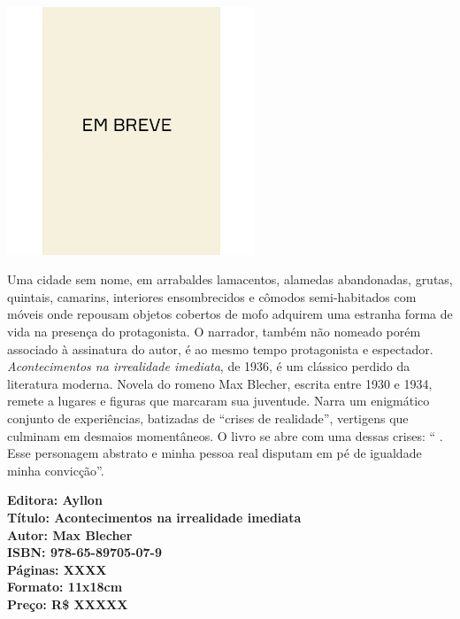 \pagebreak


\begin{center}
\hspace*{.5cm}\includegraphics[width=74mm]{./grid/breve.jpeg}
\end{center}

\hspace*{-7cm}\hrulefill\hspace*{-7cm}

\medskip

\noindent{}Uma cidade sem nome, em arrabaldes lamacentos, alamedas abandonadas, grutas, quintais, camarins, interiores ensombrecidos e cômodos semi-habitados com móveis onde repousam objetos cobertos de mofo adquirem uma estranha forma de vida na presença do protagonista. O narrador, também não nomeado porém associado à assinatura do autor, é ao mesmo tempo protagonista e espectador. 
\textit{Acontecimentos na irrealidade imediata}, de 1936, é um clássico perdido da literatura moderna. Novela do romeno Max Blecher, escrita entre 1930 e 1934, remete a lugares e figuras que marcaram sua juventude. Narra um enigmático conjunto de experiências, batizadas de ``crises de realidade'', vertigens que culminam em desmaios momentâneos. O livro se abre com uma dessas crises: `` . Esse personagem abstrato e minha pessoa real disputam em pé de igualdade minha convicção''.
\vfill

\noindent\begin{minipage}[c]{1\linewidth}
{\small\textbf{
\hspace*{-.1cm}Editora: Ayllon\\
Título: Acontecimentos na irrealidade imediata\\
Autor: Max Blecher\\ 
ISBN: 978-65-89705-07-9\\
Páginas: XXXX\\
Formato: 11x18cm\\
Preço: R\$ XXXXX\\
}}
\end{minipage}

